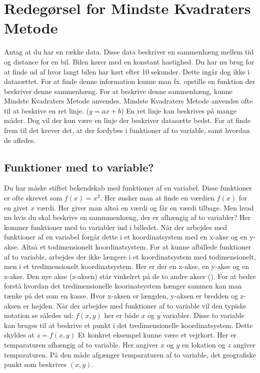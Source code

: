 \section{Redegørsel for Mindste Kvadraters Metode}
Antag at du har en række data. Disse data beskriver en sammenhæng mellem tid og distance for en bil. Bilen kører med en konstant hastighed. Du har nu brug for at finde ud af hvor langt bilen har kørt efter 10 sekunder. Dette ingår dog ikke i datasættet. For at finde denne information kunne man fx. opstille en funktion der beskriver denne sammenhæng. For at beskrive denne sammenhæng, kunne Mindste Kvadraters Metode anvendes. Mindste Kvadraters Metode anvendes ofte til at beskrive en ret linje. (\begin{math}y = ax + b\end{math}) En ret linje kan beskrives på mange måder. Dog vil der kun være en linje der beskriver datasætte bedst. For at finde frem til det krever det, at der fordybes i funktioner af to variable, samt hvordan de afledes.


\subsection{Funktioner med to variable?}\label{sec:FunktionerMedToVariable}
Du har måske stiftet bekendskab med funktioner af en variabel. Disse funktioner er ofte skrevet som \begin{math}f(x) = x^2\end{math}. Her ønsker man at finde en værdien $f(x)$ for en givet $x$ værdi. Her giver man altså en værdi og får en værdi tilbage. Men hvad nu hvis du skal beskrive en sammmenhæng, der er afhængig af to variabler? Her kommer funktioner med to variabler ind i billedet. Når der arbejdes med funktioner af en variabel forgår dette i et koordinatsystem med en x-akse og en y-akse. Altså et todimensionelt koordinatsystem. For at kunne afbillede funktioner af to variable, arbejdes der ikke længere i et koordinatsystem med todimensionelt, men i et tredimensionelt koordinatsystem. Her er der en x-akse, en y-akse og en z-akse. Den nye akse (z-aksen) står vinkelret på de to andre akser (\cite[246-248]{funktionrAfToVariable}). For at bedre forstå hvordan det tredimensionelle  koorinatsystem hænger sammen kan man tænke på det som en kasse. Hvor x-aksen er længden, y-aksen er bredden og z-aksen er højden. Når der arbejdes med funktioner af to variable vil den typiske notation se således ud: $f(x,y)$ her er både $x$ og $y$ variabler. Disse to variable kan bruges til at beskrive et punkt i det tredimensionelle koordinatsystem. Dette skyldes at $z = f(x,y)$ Et konkret eksempel kunne være et vejrkort. Her er temparaturen afhængig af to variable. Her angiver $x$ og $y$ en lokation og $z$ angiver temparaturen. På den måde afgænger temparaturen af to variable, det geografiske punkt som beskrives $(x,y)$.\\

